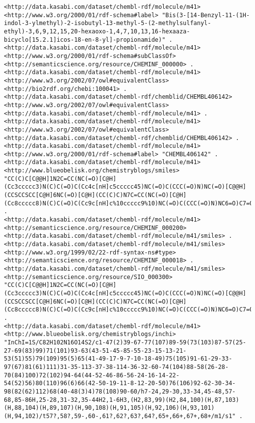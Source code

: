 \documentclass[sw]{iosart2c}
\begin{document}
\begin{tiny}
\begin{verbatim}
<http://data.kasabi.com/dataset/chembl-rdf/molecule/m41> <http://www.w3.org/2000/01/rdf-schema#label> "Bis(3-[14-Benzyl-11-(1H-indol-3-ylmethyl)-2-isobutyl-13-methyl-5-(2-methylsulfanyl-ethyl)-3,6,9,12,15,20-hexaoxo-1,4,7,10,13,16-hexaaza-bicyclo[15.2.1]icos-18-en-8-yl]-propionamide)" .
<http://data.kasabi.com/dataset/chembl-rdf/molecule/m41> <http://www.w3.org/2000/01/rdf-schema#subClassOf> <http://semanticscience.org/resource/CHEMINF_000000> .
<http://data.kasabi.com/dataset/chembl-rdf/molecule/m41> <http://www.w3.org/2002/07/owl#equivalentClass> <http://bio2rdf.org/chebi:100041> .
<http://data.kasabi.com/dataset/chembl-rdf/chemblid/CHEMBL406142> <http://www.w3.org/2002/07/owl#equivalentClass> <http://data.kasabi.com/dataset/chembl-rdf/molecule/m41> .
<http://data.kasabi.com/dataset/chembl-rdf/molecule/m41> <http://www.w3.org/2002/07/owl#equivalentClass> <http://data.kasabi.com/dataset/chembl-rdf/chemblid/CHEMBL406142> .
<http://data.kasabi.com/dataset/chembl-rdf/molecule/m41> <http://www.w3.org/2000/01/rdf-schema#label> "CHEMBL406142" .
<http://data.kasabi.com/dataset/chembl-rdf/molecule/m41> <http://www.blueobelisk.org/chemistryblogs/smiles> "CC(C)C[C@@H]1N2C=CC(NC(=O)[C@H](Cc3ccccc3)N(C)C(=O)C(Cc4c[nH]c5ccccc45)NC(=O)C(CCC(=O)N)NC(=O)[C@@H](CCSCCSCC[C@H]6NC(=O)[C@H](CC(C)C)N7C=CC(NC(=O)[C@H](Cc8ccccc8)N(C)C(=O)C(Cc9c[nH]c%10ccccc9%10)NC(=O)C(CCC(=O)N)NC6=O)C7=O)NC1=O)C2=O" .
<http://data.kasabi.com/dataset/chembl-rdf/molecule/m41> <http://semanticscience.org/resource/CHEMINF_000200> <http://data.kasabi.com/dataset/chembl-rdf/molecule/m41/smiles> .
<http://data.kasabi.com/dataset/chembl-rdf/molecule/m41/smiles> <http://www.w3.org/1999/02/22-rdf-syntax-ns#type> <http://semanticscience.org/resource/CHEMINF_000018> .
<http://data.kasabi.com/dataset/chembl-rdf/molecule/m41/smiles> <http://semanticscience.org/resource/SIO_000300> "CC(C)C[C@@H]1N2C=CC(NC(=O)[C@H](Cc3ccccc3)N(C)C(=O)C(Cc4c[nH]c5ccccc45)NC(=O)C(CCC(=O)N)NC(=O)[C@@H](CCSCCSCC[C@H]6NC(=O)[C@H](CC(C)C)N7C=CC(NC(=O)[C@H](Cc8ccccc8)N(C)C(=O)C(Cc9c[nH]c%10ccccc9%10)NC(=O)C(CCC(=O)N)NC6=O)C7=O)NC1=O)C2=O" .
<http://data.kasabi.com/dataset/chembl-rdf/molecule/m41> <http://www.blueobelisk.org/chemistryblogs/inchi> "InChI=1S/C82H102N16O14S2/c1-47(2)39-67-77(107)89-59(73(103)87-57(25-27-69(83)99)71(101)93-63(43-51-45-85-55-23-15-13-21-53(51)55)79(109)95(5)65(41-49-17-9-7-10-18-49)75(105)91-61-29-33-97(67)81(61)111)31-35-113-37-38-114-36-32-60-74(104)88-58(26-28-70(84)100)72(102)94-64(44-52-46-86-56-24-16-14-22-54(52)56)80(110)96(6)66(42-50-19-11-8-12-20-50)76(106)92-62-30-34-98(82(62)112)68(40-48(3)4)78(108)90-60/h7-24,29-30,33-34,45-48,57-68,85-86H,25-28,31-32,35-44H2,1-6H3,(H2,83,99)(H2,84,100)(H,87,103)(H,88,104)(H,89,107)(H,90,108)(H,91,105)(H,92,106)(H,93,101)(H,94,102)/t57?,58?,59-,60-,61?,62?,63?,64?,65+,66+,67+,68+/m1/s1" .

\end{verbatim}
\end{tiny}
\end{document}
